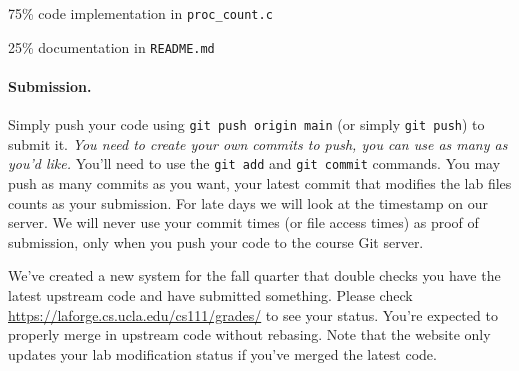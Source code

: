 75\% \hspace{0.5em} code implementation in \lstinline|proc_count.c|

25\% \hspace{0.5em} documentation in \lstinline|README.md|

\paragraph{Submission.}

Simply push your code using \lstinline|git push origin main| (or simply
\lstinline|git push|) to submit it.
\textit{You need to create your own commits to push, you can use as many
as you'd like.}
You'll need to use the \texttt{git add} and \texttt{git commit} commands.
You may push as many commits as you want, your latest commit that modifies
the lab files counts as your submission.
For late days we will look at the timestamp on our server.
We will never use your commit times (or file access times) as proof of
submission, only when you push your code to the course Git server.

We've created a new system for the fall quarter that double checks you
have the latest upstream code and have submitted something.
Please check
\url{https://laforge.cs.ucla.edu/cs111/grades/}
to see your status.
You're expected to properly merge in upstream code without rebasing.
Note that the website only updates your lab modification status
if you've merged the latest code.


